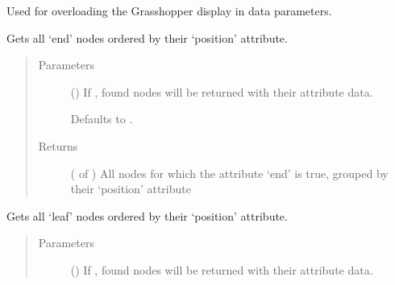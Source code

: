 \documentclass[letterpaper,10pt,english]{sphinxmanual}
\begin{document}
\begin{fulllineitems}
\begin{fulllineitems}
Used for overloading the Grasshopper display in data parameters.

\end{fulllineitems}


\begin{fulllineitems}
\label{\detokenize{cockatoo:cockatoo.KnitNetworkBase.all_ends_by_position}}
Gets all ‘end’ nodes ordered by their ‘position’ attribute.
\begin{quote}\begin{description}
\item[{Parameters}] \leavevmode
{} (\sphinxstyleliteralemphasis{\sphinxupquote{, }}) \textendash{} 
If , found nodes will be returned with their attribute
data.

Defaults to .


\item[{Returns}] \leavevmode
{} ( of ) \textendash{} All nodes for which the attribute ‘end’ is true, grouped by their
‘position’ attribute

\end{description}\end{quote}

\end{fulllineitems}


\begin{fulllineitems}
\label{\detokenize{cockatoo:cockatoo.KnitNetworkBase.all_leaves_by_position}}
Gets all ‘leaf’ nodes ordered by their ‘position’ attribute.
\begin{quote}\begin{description}
\item[{Parameters}] \leavevmode
{} (\sphinxstyleliteralemphasis{\sphinxupquote{, }}) \textendash{} 
If , found nodes will be returned with their attribute
data.


\end{description}
\end{quote}
\end{fulllineitems}
\end{fulllineitems}
\end{document}
